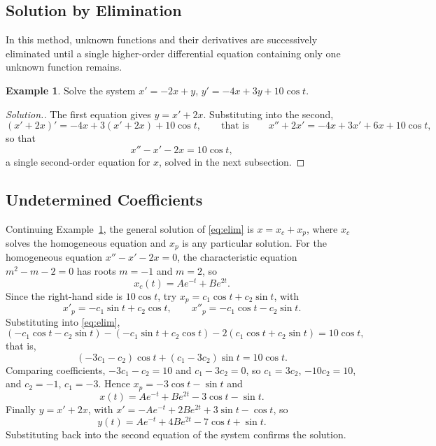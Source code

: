 \documentclass[11pt,a4paper]{article}
\theoremstyle{definition}
\newtheorem{exa}[thm]{Example}
\newenvironment{solution}
  {\renewcommand{\qedsymbol}{}\begin{proof}[\textit{Solution}.]}
  {\end{proof}}
\begin{document}
{\color[wave]{485}\subsection{Solution by Elimination}}

In this method, unknown functions and their derivatives are successively
eliminated until a single higher-order differential equation containing only one
unknown function remains.

\begin{exa}
\label{ex:elimination}
Solve the system $x' = -2x + y$, $y' = -4x + 3y + 10\cos t$.
\end{exa}

\begin{solution}
The first equation gives $y = x' + 2x$. Substituting into the second,
\[(x' + 2x)' = -4x + 3(x' + 2x) + 10\cos t,\qquad\text{that is}\qquad x'' + 2x' =
-4x + 3x' + 6x + 10\cos t ,\]
so that
\begin{equation}
x'' - x' - 2x = 10\cos t ,
\label{eq:elim}
\end{equation}
a single second-order equation for $x$, solved in the next subsection.
\end{solution}

{\color[wave]{485}\subsection{Undetermined Coefficients}}

Continuing Example~\ref{ex:elimination}, the general solution of
\eqref{eq:elim} is $x = x_c + x_p$, where $x_c$ solves the homogeneous equation
and $x_p$ is any particular solution. For the homogeneous equation
$x'' - x' - 2x = 0$, the characteristic equation $m^2 - m - 2 = 0$ has roots
$m = -1$ and $m = 2$, so
\[x_c(t) = Ae^{-t} + Be^{2t} .\]
Since the right-hand side is $10\cos t$, try $x_p = c_1\cos t + c_2 \sin t$, with
\[x'_p = -c_1 \sin t + c_2 \cos t ,\qquad x''_p = -c_1 \cos t - c_2 \sin t .\]
Substituting into \eqref{eq:elim},
\[( - c_1 \cos t - c_2 \sin t ) - ( -c_1 \sin t + c_2 \cos t) - 2( c_1 \cos t +
c_2 \sin t ) = 10 \cos t ,\]
that is,
\[( -3c_1 -c_2 ) \cos t + ( c_1 - 3c_2 ) \sin t = 10 \cos t .\]
Comparing coefficients, $-3c_1 - c_2 = 10$ and $c_1 - 3c_2 = 0$, so $c_1 = 3c_2$,
$-10c_2 = 10$, and $c_2 = -1$, $c_1 = -3$. Hence $x_p = -3\cos t - \sin t$ and
\[x(t) = A e^{-t} + B e^{2t} -3\cos t - \sin t .\]
Finally $y = x' + 2x$, with $x' = -Ae^{-t} + 2Be^{2t} + 3\sin t - \cos t$, so
\[y(t) = Ae^{-t} + 4Be^{2t} - 7\cos t + \sin t .\]
Substituting back into the second equation of the system confirms the solution.
\end{document}
